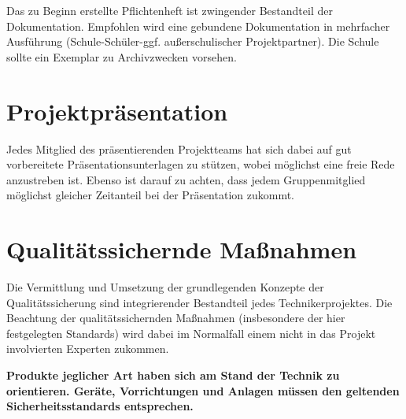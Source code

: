 Das zu Beginn erstellte Pflichtenheft ist zwingender Bestandteil der Dokumentation.
Empfohlen wird eine gebundene Dokumentation in mehrfacher Ausführung (Schule-Schüler-ggf. außerschulischer Projektpartner). Die Schule sollte ein Exemplar zu Archivzwecken vorsehen. 


\section{Projektpräsentation}

Jedes Mitglied des präsentierenden Projektteams hat sich dabei auf gut vorbereitete  Präsentationsunterlagen zu stützen, wobei möglichst eine freie Rede anzustreben ist. Ebenso ist darauf zu achten, dass jedem Gruppenmitglied möglichst gleicher Zeitanteil bei der Präsentation zukommt.

\section{Qualitätssichernde Maßnahmen}

Die Vermittlung und Umsetzung der grundlegenden Konzepte der Qualitätssicherung sind integrierender Bestandteil jedes Technikerprojektes. Die Beachtung der qualitätssichernden Maßnahmen (insbesondere der hier festgelegten Standards) wird dabei im Normalfall einem nicht in das Projekt involvierten Experten zukommen.

\textbf{Produkte jeglicher Art haben sich am Stand der Technik zu orientieren. Geräte, Vorrichtungen und Anlagen müssen den geltenden Sicherheitsstandards entsprechen.}
